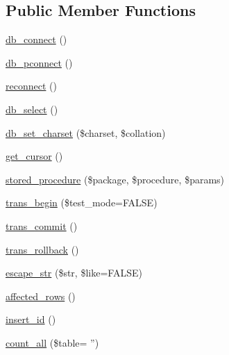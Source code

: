 \subsection*{Public Member Functions}
\begin{DoxyCompactItemize}
\item 
\hyperlink{class_c_i___d_b__oci8__driver_a6aa545dcb7768f0b62d37cdcf7f09adc}{db\-\_\-connect} ()
\item 
\hyperlink{class_c_i___d_b__oci8__driver_a0f69e662bd02de5bcf98647068e7c653}{db\-\_\-pconnect} ()
\item 
\hyperlink{class_c_i___d_b__oci8__driver_a57c19c642ab3023e28d10c50f86ff0a8}{reconnect} ()
\item 
\hyperlink{class_c_i___d_b__oci8__driver_af0c7f2602586ea2050b19fb36baefb24}{db\-\_\-select} ()
\item 
\hyperlink{class_c_i___d_b__oci8__driver_adc8cd12121dc8edda3adcadd88a97e24}{db\-\_\-set\-\_\-charset} (\$charset, \$collation)
\item 
\hyperlink{class_c_i___d_b__oci8__driver_aaf8b241dc9ed2d812e965dc882ed9ea3}{get\-\_\-cursor} ()
\item 
\hyperlink{class_c_i___d_b__oci8__driver_a39bf84e2ee9cbd2d0e8c2d12ea72a292}{stored\-\_\-procedure} (\$package, \$procedure, \$params)
\item 
\hyperlink{class_c_i___d_b__oci8__driver_a90e153cf190d273336d77cce930587e1}{trans\-\_\-begin} (\$test\-\_\-mode=F\-A\-L\-S\-E)
\item 
\hyperlink{class_c_i___d_b__oci8__driver_af4fbdcdace4aa94a139b64877601fe9b}{trans\-\_\-commit} ()
\item 
\hyperlink{class_c_i___d_b__oci8__driver_a53f76d4dfcd6ac04fb653982442aeef8}{trans\-\_\-rollback} ()
\item 
\hyperlink{class_c_i___d_b__oci8__driver_aaba16891c8c93600a87075800cc5b72b}{escape\-\_\-str} (\$str, \$like=F\-A\-L\-S\-E)
\item 
\hyperlink{class_c_i___d_b__oci8__driver_a77248aaad33eb132c04cc4aa3f4bc8cb}{affected\-\_\-rows} ()
\item 
\hyperlink{class_c_i___d_b__oci8__driver_a933f2cde8dc7f87875e257d0a4902e99}{insert\-\_\-id} ()
\item 
\hyperlink{class_c_i___d_b__oci8__driver_a66111c61856499b091af32502978d4fc}{count\-\_\-all} (\$table= '')
\end{DoxyCompactItemize}
